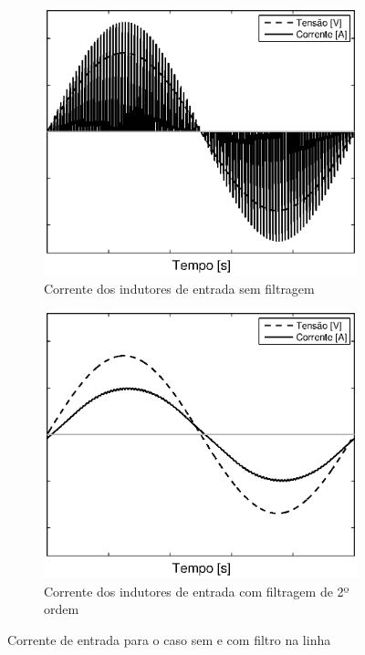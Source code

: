 \begin{figure}[!htbp] %
	\centering
	\begin{subfigure}[b]{0.499\textwidth}
	\centering
	\includegraphics[width=\textwidth]{Cap2/Figuras/PFC_unfilt.eps}
	\caption{Corrente dos indutores de entrada sem filtragem}
	\label{fig:PFC_unfilt}
	\end{subfigure}%
	\hfill
	\begin{subfigure}[b]{0.499\textwidth}  
		\centering 
		\includegraphics[width=\textwidth]{Cap2/Figuras/PFC_filt}
		\caption{Corrente dos indutores de entrada  com filtragem de 2º ordem}    
		\label{fig:PFC_filt}
	\end{subfigure}%
	\caption{Corrente de entrada para o caso sem e com filtro na linha}
	\label{fig:PFC_waveforms}
\end{figure}
